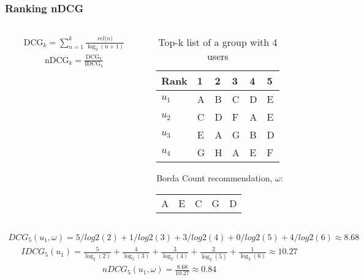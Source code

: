 \begin{frame}[t]
\frametitle{Ranking nDCG}
\begin{columns}
\begin{column}{0.45\textwidth}
\begin{align*}
\text{DCG}_k = \sum_{n=1}^{k}\frac{\textit{rel(n)}}{\log_2(n + 1)}
\end{align*}
\begin{align*}
\text{nDCG}_k = \frac{\text{DCG}_k}{\text{IDCG}_k}
\end{align*}

\end{column}
\begin{column}{0.55\textwidth}
\small
\vspace{-0.5cm}
\begin{table}
\captionsetup{font=footnotesize}
\begin{tabular}{|l|lllll|} \hline
Rank  & 1 & 2 & 3 & 4 & 5 \\\hline
$u_1$ & A & B & C & D & E \\
$u_2$ & C & D & F & A & E \\
$u_3$ & E & A & G & B & D \\
$u_4$ & G & H & A & E & F\\\hline
\end{tabular}
\caption{Top-k list of a group with 4 users}
\end{table}
\normalsize
Borda Count recommendation, $\omega$: \\
\begin{table}
\centering
\begin{tabular}{lllll}
 A & E & C & G & D
\end{tabular}
\end{table}
\end{column}
\end{columns}
\small
\begin{align*}
DCG_5(u_1, \omega) = 5/log2(2) + 1/log2(3) + 3/log2(4) + 0/log2(5) + 4/log2(6) \approx 8.68
\end{align*}
\begin{align*}
IDCG_5(u_1) = \frac{5}{\log_2(2)}+\frac{4}{\log_2(3)}+\frac{3}{\log_2(4)}+\frac{2}{\log_2(5)}+\frac{1}{\log_2(6)} \approx 10.27
\end{align*}
\begin{align*}
nDCG_5(u_1, \omega) = \frac{8.68}{10.27} \approx 0.84
\end{align*}
\normalsize
\end{frame}

%
%
%
